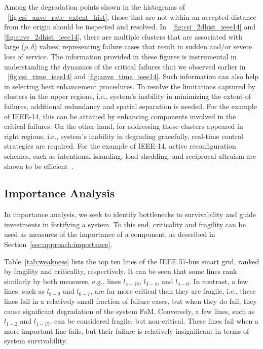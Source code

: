 \documentclass[review]{elsarticle}
\begin{document}
Among the degradation points shown in the histograms of \figurename~\ref{fig:csi_anve_rate_extent_hist}, those that are not within an accepted distance from the origin should be inspected and resolved. In \figurename~\ref{fig:csi_2dhist_ieee14} and \ref{fig:anve_2dhist_ieee14}, there are multiple clusters that are associated with large ($\rho, \delta$) values, representing failure cases that result in sudden and/or severe loss of service. The information provided in these figures is instrumental in understanding the dynamics of the critical failures that we observed earlier in \figurename~\ref{fig:csi_time_ieee14} and \ref{fig:anve_time_ieee14}. Such information can also help in selecting best enhancement procedures. To resolve the limitations captured by clusters in the upper regions, i.e., system's inability in minimizing the extent of failures, additional redundancy and spatial separation is needed. For the example of IEEE-14, this can be attained by enhancing components involved in the critical failures. On the other hand, for addressing those clusters appeared in right regions, i.e., system's inability in degrading gracefully, real-time control strategies are required. For the example of IEEE-14, active reconfiguration schemes, such as intentional islanding, load shedding, and reciprocal altruism are shown to be efficient~\cite{PaY13}.

\subsection{Importance Analysis}
\label{sec:case_study:import_analysis}
In importance analysis, we seek to identify bottlenecks to survivability and guide investments in fortifying a system. To this end, criticality and fragility can be used as measures of the importance of a component, as described in Section~\ref{sec:approach:importance}.

Table~\ref{tab:weakness} lists the top ten lines of the IEEE 57-bus smart grid, ranked by fragility and criticality, respectively. It can be seen that some lines rank similarly by both measures, e.g., lines $l_{4-18}$, $l_{3-4}$, and $l_{4-6}$. In contrast, a few lines, such as $l_{8-9}$ and $l_{6-7}$, are far more critical than they are fragile, i.e., these lines fail in a relatively small fraction of failure cases, but when they do fail, they cause significant degradation of the system FoM. Conversely, a few lines, such as $l_{1-2}$ and $l_{1-15}$, can be considered fragile, but non-critical. These lines fail when a more important line fails, but their failure is relatively insignificant in terms of system survivability.
\end{document}
